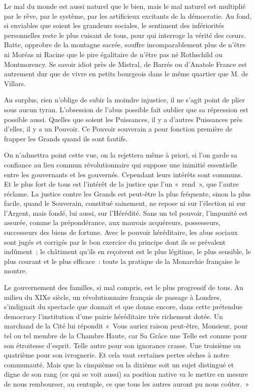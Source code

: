 \documentclass[french,twoside]{book} %
\begin{document}
Le mal du monde est aussi naturel que le bien, mais le mal naturel est multiplié par le rêve, par le système, par les artificieux excitants de la démocratie. Au fond, si enviables que soient les grandeurs sociales, le sentiment des infériorités personnelles reste le plus cuisant de tous, pour qui interroge la vérité des cœurs. Batte, opprobre de la montagne sacrée, souffre incomparablement plus de n’être ni Moréas ni Racine que le pire égalitaire de n’être pas né Rothschild ou Montmorency. Se savoir idiot près de Mistral, de Barrés ou d’Anatole France est autrement dur que de vivre en petits bourgeois dans le même quartier que M. de Villars.\par
Au surplus, rien n’oblige de subir la moindre injustice, il ne s’agit point de plier sous aucun tyran. L’obsession de l’abus possible fait oublier que sa répression est possible aussi. Quelles que soient les Puissances, il y a d’autres Puissances près d’elles, il y a un Pouvoir. Ce Pouvoir souverain a pour fonction première de frapper les Grands quand ils sont fautifs.\par
On n’admettra point cette vue, on la rejettera même à priori, si l’on garde sa confiance au lieu commun révolutionnaire qui suppose une inimitié essentielle entre les gouvernants et les gouvernés. Cependant leurs intérêts sont communs. Et le plus fort de tous est l’intérêt de la justice que l’un « rend », que l’autre réclame. La justice contre les Grands est peut-être la plus fréquente, sinon la plus facile, quand le Souverain, constitué sainement, ne repose ni sur l’élection ni sur l’Argent, mais fondé, lui aussi, sur l’Hérédité. Sans un tel pouvoir, l’impunité est assurée, comme la prépondérance, aux mauvais acquéreurs, possesseurs, successeurs des biens de fortune. Avec le pouvoir héréditaire, les abus sociaux sont jugés et corrigés par le bon exercice du principe dont ils se prévalent indûment ; le châtiment qu’ils en reçoivent est le plus légitime, le plus sensible, le plus courant et le plus efficace : toute la pratique de la Monarchie française le montre.\par
Le gouvernement des familles, si mal compris, est le plus progressif de tous. Au milieu du XIXe siècle, un révolutionnaire français de passage à Londres, s’indignait du spectacle que donnait et que donne encore, dans cette prétendue democracy l’institution d’une pairie héréditaire très richement dotée. Un marchand de la Cité lui répondit « Vous auriez raison peut-être, Monsieur, pour tel ou tel membre de la Chambre Haute, car Sa Grâce une Telle est connue pour son étroitesse d’esprit. Telle autre pour son ignorance crasse. Une troisième ou quatrième pour son ivrognerie. Et cela vaut certaines pertes sèches à notre communauté. Mais que la cinquième ou la dixième soit un sujet distingué et digne de son rang (ce qui se voit aussi) sa position native va le mettre en mesure de nous rembourser, au centuple, ce que tous les autres auront pu nous coûter. »\par
\end{document}
